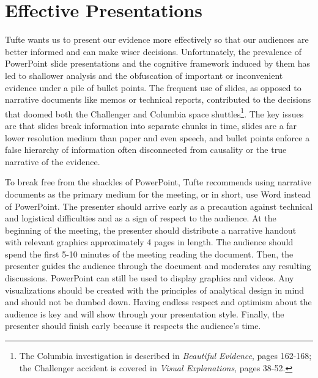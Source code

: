 \documentclass{tufte-handout}
\begin{document}
\section{Effective Presentations}
Tufte wants us to present our evidence more effectively so that our audiences are better informed and can make wiser decisions. Unfortunately, the prevalence of PowerPoint slide presentations and the cognitive framework induced by them has led to shallower analysis and the obfuscation of important or inconvenient evidence under a pile of bullet points. The frequent use of slides, as opposed to narrative documents like memos or technical reports, contributed to the decisions that doomed both the Challenger and Columbia space shuttles\footnote{The Columbia investigation is described in \textit{Beautiful Evidence}, pages 162-168; the Challenger accident is covered in \textit{Visual Explanations}, pages 38-52.}. The key issues are that slides break information into separate chunks in time, slides are a far lower resolution medium than paper and even speech, and bullet points enforce a false hierarchy of information often disconnected from causality or the true narrative of the evidence.

To break free from the shackles of PowerPoint, Tufte recommends using narrative documents as the primary medium for the meeting, or in short, use Word instead of PowerPoint. The presenter should arrive early as a precaution against technical and logistical difficulties and as a sign of respect to the audience. At the beginning of the meeting, the presenter should distribute a narrative handout with relevant graphics approximately 4 pages in length. The audience should spend the first 5-10 minutes of the meeting reading the document. Then, the presenter guides the audience through the document and moderates any resulting discussions. PowerPoint can still be used to display graphics and videos. Any visualizations should be created with the principles of analytical design in mind and should not be dumbed down. Having endless respect and optimism about the audience is key and will show through your presentation style. Finally, the presenter should finish early because it respects the audience's time. 
\end{document}
